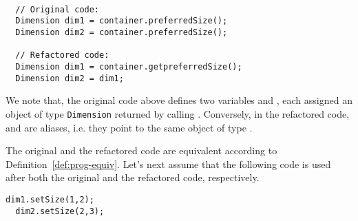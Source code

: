 \documentclass[sigconf,review,anonymous]{acmart}
\begin{document}

\begin{example}\label{ex:aliasing}
  \begin{lstlisting}[mathescape=true,showstringspaces=false]
    
  // Original code:
  Dimension dim1 = container.preferredSize();
  Dimension dim2 = container.preferredSize();    

  // Refactored code:
  Dimension dim1 = container.getpreferredSize();  
  Dimension dim2 = dim1;
\end{lstlisting}



    




We note that, the original code above defines two variables  and
, each assigned an object of type \texttt{Dimension} returned by calling
.
Conversely, in the refactored code,  and  are aliases, i.e. they point to the same
object of type .

The original and the refactored code are equivalent according to Definition~\ref{def:prog-equiv}.
Let's next assume that the following code
is used after both the original and the refactored code, respectively.

\begin{lstlisting}[mathescape=true,showstringspaces=false]
  dim1.setSize(1,2);
  dim2.setSize(2,3);  
\end{lstlisting}


\end{example}
\end{document}
